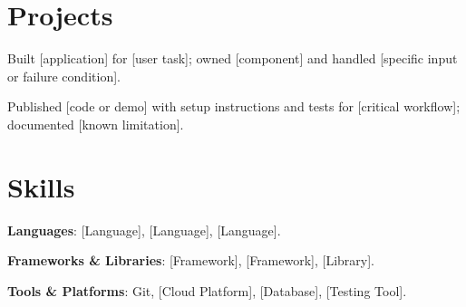 \documentclass{resume}
\begin{document}
\section{Projects}

\begin{jobduties}
  \item Built [application] for [user task]; owned [component] and handled [specific input or failure condition].
  \item Published [code or demo] with setup instructions and tests for [critical workflow]; documented [known limitation].
\end{jobduties}


\section{Skills}
\begin{skillitems}
  \item \textbf{Languages}: [Language], [Language], [Language].
  \item \textbf{Frameworks \& Libraries}: [Framework], [Framework], [Library].
  \item \textbf{Tools \& Platforms}: Git, [Cloud Platform], [Database], [Testing Tool].
\end{skillitems}
\end{document}
